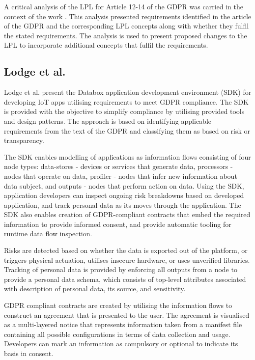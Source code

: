 A critical analysis of the LPL for Article 12-14 of the GDPR was carried in the context of the work \cite{gerl_critical_2018}. This analysis presented requirements identified in the article of the GDPR and the corresponding LPL concepts along with whether they fulfil the stated requirements.
The analysis is used to present proposed changes to the LPL to incorporate additional concepts that fulfil the requirements.

\subsection*{Lodge et al.}
Lodge et al. \cite{garcia-alfaro_developing_2018} present the Databox application development environment (SDK) for developing IoT apps utilising requirements to meet GDPR compliance. The SDK is provided with the objective to simplify compliance by utilising provided tools and design patterns.
The approach is based on identifying applicable requirements from the text of the GDPR and classifying them as based on risk or transparency.

The SDK enables modelling of applications as information flows consisting of four node types: data-stores - devices or services that generate data, processors - nodes that operate on data, profiler - nodes that infer new information about data subject, and outputs - nodes that perform action on data. Using the SDK, application developers can inspect ongoing risk breakdowns based on developed application, and track personal data as its moves through the application. The SDK also enables creation of GDPR-compliant contracts that embed the required information to provide informed consent, and provide automatic tooling for runtime data flow inspection.

Risks are detected based on whether the data is exported out of the platform, or triggers physical actuation, utilises insecure hardware, or uses unverified libraries. Tracking of personal data is provided by enforcing all outputs from a node to provide a personal data schema, which consists of top-level attributes associated with description of personal data, its source, and sensitivity.

GDPR compliant contracts are created by utilising the information flows to construct an agreement that is presented to the user. The agreement is visualised as a multi-layered notice that represents information taken from a manifest file containing all possible configurations in terms of data collection and usage. Developers can mark an information as compulsory or optional to indicate its basis in consent.

